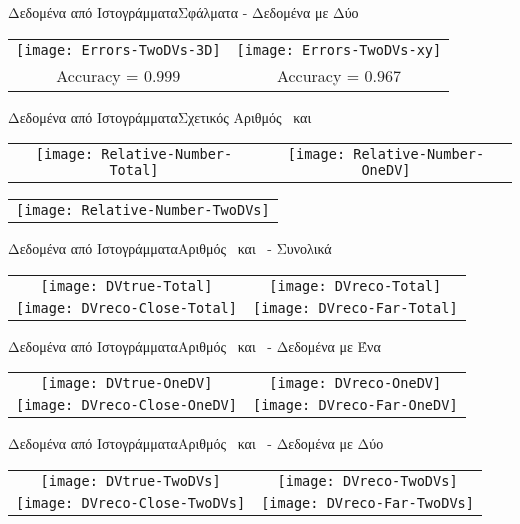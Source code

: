 \begin{frame}{Δεδομένα από Ιστογράμματα}{Σφάλματα - Δεδομένα με Δύο \dvtrue}
	\centering
	\begin{tabular}{c c}
		\texttt{[image: Errors-TwoDVs-3D]} & 
		\texttt{[image: Errors-TwoDVs-xy]} \\[4mm]
		\small{Accuracy = $0.999$} & \small{Accuracy = $0.967$}
	\end{tabular}
\end{frame}

\begin{frame}{Δεδομένα από Ιστογράμματα}{Σχετικός Αριθμός \dvreco\ και \dvtrue}
	\centering
	\begin{tabular}{c c}
		\texttt{[image: Relative-Number-Total]} &
		\texttt{[image: Relative-Number-OneDV]} 
	\end{tabular}
	\begin{tabular}{c}
		\texttt{[image: Relative-Number-TwoDVs]}
	\end{tabular}
\end{frame}

\begin{frame}{Δεδομένα από Ιστογράμματα}{Αριθμός \dvreco\ και \dvtrue\ - Συνολικά}
	\centering
	\begin{tabular}{c c}
		\texttt{[image: DVtrue-Total]} &
		\texttt{[image: DVreco-Total]} \\
		\texttt{[image: DVreco-Close-Total]} &
		\texttt{[image: DVreco-Far-Total]}
	\end{tabular}
\end{frame}

\begin{frame}{Δεδομένα από Ιστογράμματα}{Αριθμός \dvreco\ και \dvtrue\ - Δεδομένα με Ένα \dvtrue}
	\centering
	\begin{tabular}{c c}
		\texttt{[image: DVtrue-OneDV]} &
		\texttt{[image: DVreco-OneDV]} \\
		\texttt{[image: DVreco-Close-OneDV]} &
		\texttt{[image: DVreco-Far-OneDV]}
	\end{tabular}
\end{frame}

\begin{frame}{Δεδομένα από Ιστογράμματα}{Αριθμός \dvreco\ και \dvtrue\ - Δεδομένα με Δύο \dvtrue}
	\centering
	\begin{tabular}{c c}
		\texttt{[image: DVtrue-TwoDVs]} &
		\texttt{[image: DVreco-TwoDVs]} \\
		\texttt{[image: DVreco-Close-TwoDVs]} &
		\texttt{[image: DVreco-Far-TwoDVs]}
	\end{tabular}
\end{frame}